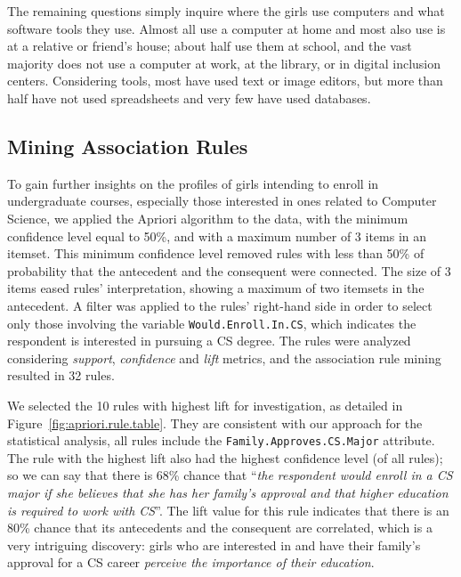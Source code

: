 The remaining questions simply inquire where the girls use computers and what software tools they use. Almost all use a computer at home and most also use is at a relative or friend's house; about half use them at school, and the vast majority does not use a computer at work, at the library, or in digital inclusion centers. Considering tools, most have used text or image editors, but more than half have not used spreadsheets and very few have used databases.

\subsection{Mining Association Rules}\label{sec:perception:mining}%
To gain further insights on the profiles of girls intending to enroll in undergraduate courses, especially those interested in ones related to Computer Science, we applied the Apriori algorithm to the data, with the minimum confidence level equal to 50\%, and with a maximum number of 3 items in an itemset. This minimum confidence level removed rules with less than 50\% of probability that the antecedent and the consequent were connected. The size of 3 items eased rules' interpretation, showing a maximum of two itemsets in the antecedent. A filter was applied to the rules' right-hand side in order to select only those involving the variable \texttt{Would.Enroll.In.CS}, which indicates the respondent is interested in pursuing a CS degree. The rules were analyzed considering \emph{support}, \emph{confidence} and \emph{lift} metrics, and the association rule mining resulted in 32 rules.

We selected the 10 rules with highest lift for investigation, as detailed in Figure~\ref{fig:apriori.rule.table}. They are consistent with our approach for the statistical analysis, all rules include the \mbox{\texttt{Family.Approves.CS.Major}} attribute. The rule with the highest lift also had the highest confidence level (of all rules); so we can say that there is 68\% chance that ``\emph{the respondent would enroll in a CS major if she believes that she has her family's approval and that higher education is required to work with CS}''. The lift value for this rule indicates that there is an 80\% chance that its antecedents and the consequent are correlated, which is a very intriguing discovery: girls who are interested in and have their family's approval for a CS career \emph{perceive the importance of their education}.

